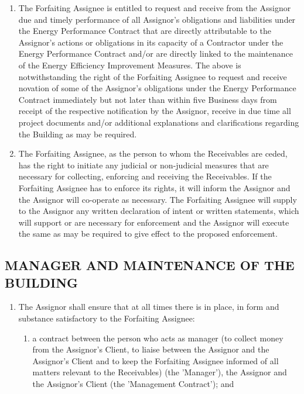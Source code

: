 \documentclass[a4paper]{article}
\begin{document}
\begin{multicols}{2}
\begin{enumerate}
  \item{The Forfaiting Assignee is entitled to request and receive
      from the Assignor due and timely performance of all Assignor’s
      obligations and liabilities under the Energy Performance
      Contract that are directly attributable to the Assignor’s
      actions or obligations in its capacity of a Contractor under the
      Energy Performance Contract and/or are directly linked to the
      maintenance of the Energy Efficiency Improvement Measures. The
      above is notwithstanding the right of the Forfaiting Assignee to
      request and receive novation of some of the Assignor’s
      obligations under the Energy Performance Contract immediately
      but not later than within five Business days from receipt of the
      respective notification by the Assignor, receive in due time all
      project documents and/or additional explanations and
      clarifications regarding the Building as may be required.}

  \item{The Forfaiting Assignee, as the person to whom the Receivables
      are ceded, has the right to initiate any judicial or
      non{-}judicial measures that are necessary for collecting,
      enforcing and receiving the Receivables. If the Forfaiting
      Assignee has to enforce its rights, it will inform the Assignor
      and the Assignor will co{-}operate as necessary. The Forfaiting
      Assignee will supply to the Assignor any written declaration of
      intent or written statements, which will support or are
      necessary for enforcement and the Assignor will execute the same
      as may be required to give effect to the proposed enforcement.}
  \end{enumerate}

  \subsection{MANAGER AND MAINTENANCE OF THE BUILDING}

  \begin{enumerate}
  \item{The Assignor shall ensure that at all times there is in place,
      in form and substance satisfactory to the Forfaiting Assignee:}

    \begin{enumerate}
    \item{a contract between the person who acts as manager (to
        collect money from the Assignor's Client, to liaise between
        the Assignor and the Assignor's Client and to keep the
        Forfaiting Assignee informed of all matters relevant to the
        Receivables) (the 'Manager'), the Assignor and the Assignor's
        Client (the 'Management Contract'); and}


\end{enumerate}
\end{enumerate}
\end{multicols}
\end{document}
